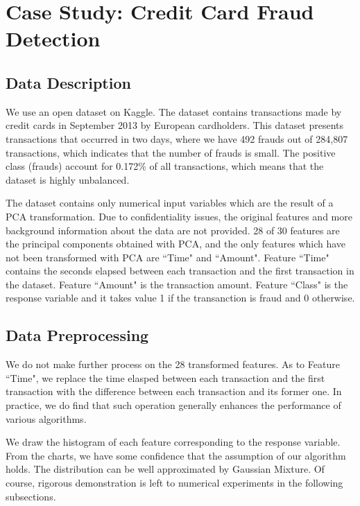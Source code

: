 \documentclass[english]{article}
\begin{document}
\section{Case Study: Credit Card Fraud Detection}

\subsection{Data Description}
\par We use an open dataset on Kaggle. The dataset contains transactions made by credit cards in September 2013 by European cardholders. This dataset presents transactions that occurred in two days, where we have 492 frauds out of 284,807 transactions, which indicates that the number of frauds is small. The positive class (frauds) account for 0.172\% of all transactions, which means that the dataset is highly unbalanced.

The dataset contains only numerical input variables which are the result of a PCA transformation. Due to confidentiality issues, the original features and more background information about the data are not provided. 28 of 30 features are the principal components obtained with PCA, and the only features which have not been transformed with PCA are ``Time" and ``Amount". Feature ``Time" contains the seconds elapsed between each transaction and the first transaction in the dataset. Feature ``Amount" is the transaction amount. Feature ``Class" is the response variable and it takes value 1 if the transanction is fraud and 0 otherwise.

\subsection{Data Preprocessing}
\par We do not make further process on the 28 transformed features. As to Feature ``Time", we replace the time elasped between each transaction and the first transaction with the difference between each transaction and its former one. In practice, we do find that such operation generally enhances the performance of various algorithms.

\par We draw the histogram of each feature corresponding to the response variable. From the charts, we have some confidence that the assumption of our algorithm holds. The distribution can be well approximated by Gaussian Mixture. Of course, rigorous demonstration is left to numerical experiments in the following subsections.
\end{document}
